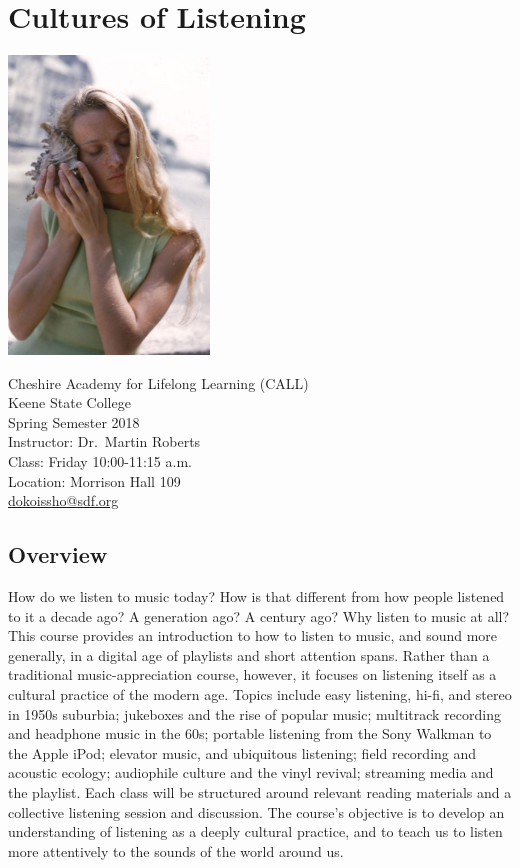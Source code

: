 \documentclass[
  letterpaper,
  DIV=11,
  numbers=noendperiod]{scrartcl}
\author{}
\date{}
\begin{document}
\section{Cultures of Listening}\label{cultures-of-listening}

\includegraphics[width=0.4\textwidth,height=\textheight]{eliane-radigue.jpg}

Cheshire Academy for Lifelong Learning (CALL)\\
Keene State College\\
Spring Semester 2018\\
Instructor: Dr.~Martin Roberts\\
Class: Friday 10:00-11:15 a.m.\\
Location: Morrison Hall 109\\
\href{mailto:dokoissho@pm.me}{dokoissho@sdf.org}\\

\subsection{Overview}\label{overview}

How do we listen to music today? How is that different from how people
listened to it a decade ago? A generation ago? A century ago? Why listen
to music at all? This course provides an introduction to how to listen
to music, and sound more generally, in a digital age of playlists and
short attention spans. Rather than a traditional music-appreciation
course, however, it focuses on listening itself as a cultural practice
of the modern age. Topics include easy listening, hi-fi, and stereo in
1950s suburbia; jukeboxes and the rise of popular music; multitrack
recording and headphone music in the 60s; portable listening from the
Sony Walkman to the Apple iPod; elevator music, and ubiquitous
listening; field recording and acoustic ecology; audiophile culture and
the vinyl revival; streaming media and the playlist. Each class will be
structured around relevant reading materials and a collective listening
session and discussion. The course's objective is to develop an
understanding of listening as a deeply cultural practice, and to teach
us to listen more attentively to the sounds of the world around us.
\end{document}
